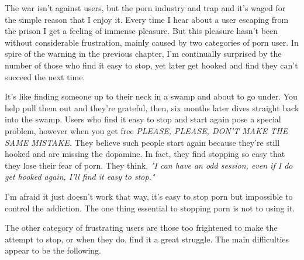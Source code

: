 \documentclass[easypeasy.tex]{subfiles}
\begin{document}
The war isn't against users, but the porn industry and trap and it's waged for the simple reason that I enjoy it. Every time I hear about a user escaping from the prison I get a feeling of immense pleasure. But this pleasure hasn't been without considerable frustration, mainly caused by two categories of porn user. In spire of the warning in the previous chapter, I'm continually surprised by the number of those who find it easy to stop, yet later get hooked and find they can't succeed the next time.

It's like finding someone up to their neck in a swamp and about to go under. You help pull them out and they're grateful, then, six months later dives straight back into the swamp. Users who find it easy to stop and start again pose a special problem, however when you get free \textit{PLEASE, PLEASE, DON'T MAKE THE SAME MISTAKE.} They believe such people start again because they're still hooked and are missing the dopamine. In fact, they find stopping so easy that they lose their fear of porn. They think, \textit{"I can have an odd session, even if I do get hooked again, I'll find it easy to stop."}

I'm afraid it just doesn't work that way, it's easy to stop porn but impossible to control the addiction. The one thing essential to stopping porn is not to using it. 

The other category of frustrating users are those too frightened to make the attempt to stop, or when they do, find it a great struggle. The main difficulties appear to be the following.
\end{document}
